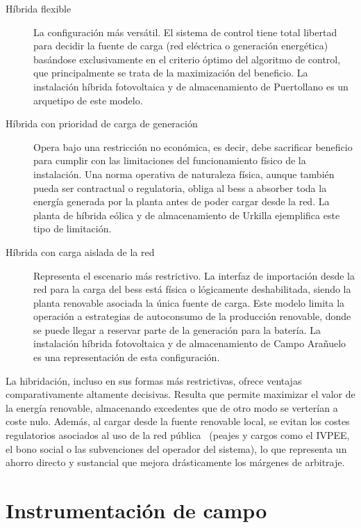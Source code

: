 \begin{description}

  \item[Híbrida flexible] La configuración más versátil. El sistema de control tiene total libertad para decidir la fuente de carga (red eléctrica o generación energética) basándose exclusivamente en el criterio óptimo del algoritmo de control, que principalmente se trata de la maximización del beneficio. La instalación híbrida fotovoltaica y de almacenamiento de Puertollano es un arquetipo de este modelo.

  \item[Híbrida con prioridad de carga de generación] Opera bajo una restricción no económica, es decir, debe sacrificar beneficio para cumplir con las limitaciones del funcionamiento físico de la instalación. Una norma operativa de naturaleza física, aunque también pueda ser contractual o regulatoria, obliga al \gls{bess} a absorber toda la energía generada por la planta antes de poder cargar desde la red. La planta de híbrida eólica y de almacenamiento de Urkilla ejemplifica este tipo de limitación.

  \item[Híbrida con carga aislada de la red] Representa el escenario más restrictivo. La interfaz de importación desde la red para la carga del \gls{bess} está física o lógicamente deshabilitada, siendo la planta renovable asociada la única fuente de carga. Este modelo limita la operación a estrategias de autoconsumo de la producción renovable, donde se puede llegar a reservar parte de la generación para la batería. La instalación híbrida fotovoltaica y de almacenamiento de Campo Arañuelo es una representación de esta configuración.

\end{description}

La hibridación, incluso en sus formas más restrictivas, ofrece ventajas comparativamente altamente decisivas. Resulta que permite maximizar el valor de la energía renovable, almacenando excedentes que de otro modo se verterían a coste nulo. Además, al cargar desde la fuente renovable local, se evitan los costes regulatorios asociados al uso de la red pública~\cite{mterd2024orden} (peajes y cargos como el IVPEE, el bono social o las subvenciones del operador del sistema), lo que representa un ahorro directo y sustancial que mejora drásticamente los márgenes de arbitraje.

\section{Instrumentación de campo}
\label{makereference3.2}

